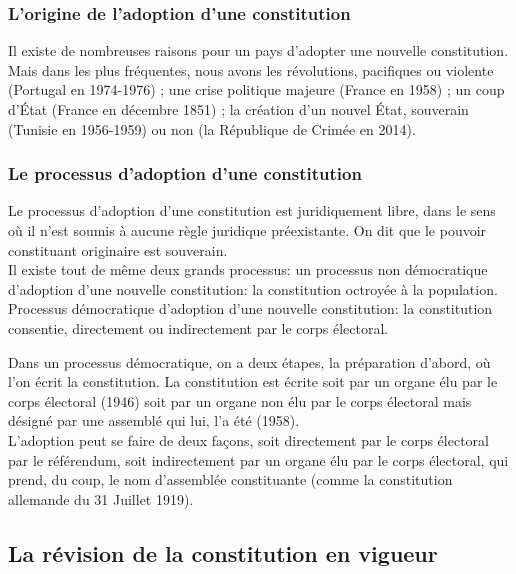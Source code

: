 \documentclass[12pt, a4paper, openany]{book}
\begin{document}
\subsubsection{L'origine de l'adoption d'une constitution}

Il existe de nombreuses raisons pour un pays d'adopter une nouvelle constitution. Mais dans les plus fréquentes, nous avons les révolutions, pacifiques ou violente (Portugal en 1974-1976) ; une crise politique majeure (France en 1958) ; un coup d'État (France en décembre 1851) ; la création d'un nouvel État, souverain (Tunisie en 1956-1959) ou non (la République de Crimée en 2014).

\subsubsection{Le processus d'adoption d'une constitution}

Le processus d'adoption d'une constitution est juridiquement libre, dans le sens où il n'est soumis à aucune règle juridique préexistante. On dit que le pouvoir constituant originaire est souverain. \\
Il existe tout de même deux grands processus: un processus non démocratique d'adoption d'une nouvelle constitution: la constitution octroyée à la population. Processus démocratique d'adoption d'une nouvelle constitution: la constitution consentie, directement ou indirectement par le corps électoral.


Dans un processus démocratique, on a deux étapes, la préparation d'abord, où l'on écrit la constitution. La constitution est écrite soit par un organe élu par le corps électoral (1946) soit par un organe non élu par le corps électoral mais désigné par une assemblé qui lui, l'a été (1958).\\
L'adoption peut se faire de deux façons, soit directement par le corps électoral par le référendum, soit indirectement par un organe élu par le corps électoral, qui prend, du coup, le nom d'assemblée constituante (comme la constitution allemande du 31 Juillet 1919).


\subsection{La révision de la constitution en vigueur}
\end{document}
